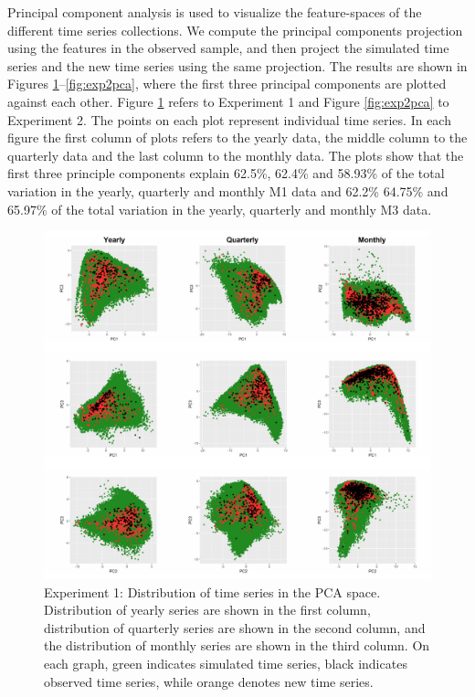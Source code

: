 \documentclass[11pt,a4paper,]{article}
\theoremstyle{definition}
\theoremstyle{definition}
\theoremstyle{definition}
\theoremstyle{remark}
\begin{document}
Principal component analysis is used to visualize the feature-spaces of
the different time series collections. We compute the principal
components projection using the features in the observed sample, and
then project the simulated time series and the new time series using the
same projection. The results are shown in Figures
\ref{fig:exp1pca}--\ref{fig:exp2pca}, where the first three principal
components are plotted against each other. Figure \ref{fig:exp1pca}
refers to Experiment 1 and Figure \ref{fig:exp2pca} to Experiment 2. The
points on each plot represent individual time series. In each figure the
first column of plots refers to the yearly data, the middle column to
the quarterly data and the last column to the monthly data. The plots
show that the first three principle components explain 62.5\%, 62.4\%
and 58.93\% of the total variation in the yearly, quarterly and monthly
M1 data and 62.2\% 64.75\% and 65.97\% of the total variation in the
yearly, quarterly and monthly M3 data.

\begin{figure}

{\centering \includegraphics[width=\textwidth]{figure/exp1pca-1} 

}

\caption{Experiment 1: Distribution of time series in the PCA space. Distribution of yearly series are shown in the first column, distribution of quarterly series are shown in the second column, and the distribution of monthly series are shown in the third column. On each graph, green indicates simulated time series, black indicates observed time series, while orange denotes new time series.}\label{fig:exp1pca}
\end{figure}
\end{document}
